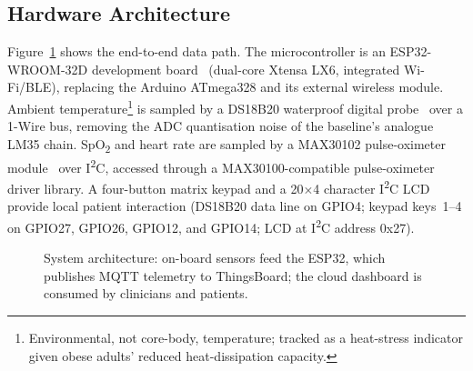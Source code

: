 \documentclass[pdflatex,sn-mathphys-num]{sn-jnl}
\begin{document}
\subsection{Hardware Architecture}

Figure~\ref{fig:arch} shows the end-to-end data path. The
microcontroller is an ESP32-WROOM-32D development board~\cite{espressif}
(dual-core Xtensa LX6, integrated Wi-Fi/BLE), replacing the Arduino
ATmega328 and its external wireless module. Ambient
temperature\footnote{Environmental, not core-body, temperature;
tracked as a heat-stress indicator given obese adults' reduced
heat-dissipation capacity.} is sampled by a DS18B20 waterproof
digital probe~\cite{ds18b20ds} over a 1-Wire bus, removing the ADC
quantisation noise of the baseline's analogue LM35 chain.
SpO\textsubscript{2} and heart rate are sampled
by a MAX30102 pulse-oximeter module~\cite{max30102ds} over
I\textsuperscript{2}C, accessed through a MAX30100-compatible
pulse-oximeter driver library. A four-button matrix keypad and a
20$\times$4 character I\textsuperscript{2}C LCD provide local patient
interaction (DS18B20 data line on GPIO4; keypad keys~1--4 on GPIO27,
GPIO26, GPIO12, and GPIO14; LCD at I\textsuperscript{2}C address
0x27).

\begin{figure}[!htbp]
\centering
{}
\caption{System architecture: on-board sensors feed the ESP32, which
publishes MQTT telemetry to ThingsBoard; the cloud dashboard is
consumed by clinicians and patients.}\label{fig:arch}
\end{figure}
\end{document}
